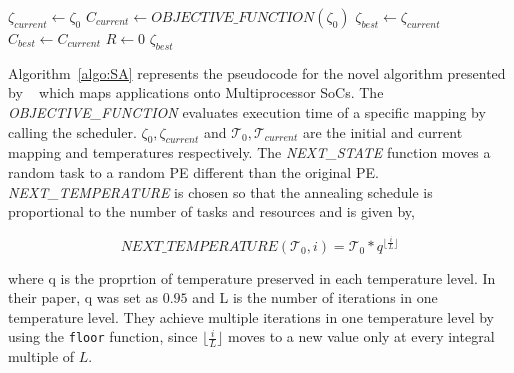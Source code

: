 \begin{algorithm}[h!]
  \small{
    \caption{$Simulated\_Annealing(\zeta_0, \mathcal{T}_0)$}
    \label{algo:SA}
    $\zeta_{current} \leftarrow \zeta_0$ \;
    $C_{current} \leftarrow OBJECTIVE\_FUNCTION(\zeta_0)$ \;
    $\zeta_{best} \leftarrow \zeta_{current}$\;
    $C_{best} \leftarrow C_{current}$\;
    $R \leftarrow 0$\;
    \Return $\zeta_{best}$
  }
\end{algorithm}

Algorithm~\ref{algo:SA} represents the pseudocode for the novel algorithm
presented by ~\cite{hors06} which maps applications onto Multiprocessor SoCs.
The \textit{OBJECTIVE\_FUNCTION} evaluates execution time of a
specific mapping by calling the scheduler. $\zeta_0, \zeta_{current}$ and
$\mathcal{T}_0, \mathcal{T}_{current}$ are the initial and current mapping and
temperatures respectively. The \textit{NEXT\_STATE} function moves a random task
to a random PE different than the original PE. \textit{NEXT\_TEMPERATURE} is
chosen so that the annealing schedule is proportional to the number of tasks and
resources and is given by,

\begin{equation}
\textit{NEXT\_TEMPERATURE}(\mathcal{T}_0, i) = \mathcal{T}_0*q^{\lfloor
\frac{i}{L} \rfloor}
\end{equation}

where q is the proprtion of temperature preserved in each temperature level. In
their paper, q was set as $0.95$ and L is the number of iterations in one
temperature level. They achieve multiple iterations in one temperature level by
using the \texttt{floor} function, since $\lfloor \frac{i}{L} \rfloor$ moves to
a new value only at every integral multiple of $L$.

